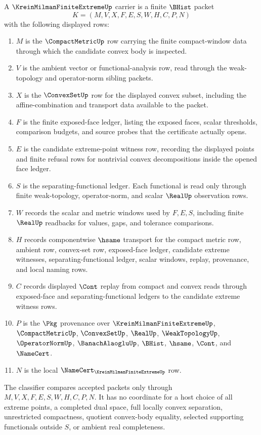 \begin{definition}
\label{def:krein-milman-finite-extreme-carrier}
A $\KreinMilmanFiniteExtremeUp$ carrier is a finite $\BHist$ packet
$$
K=(M,V,X,F,E,S,W,H,C,P,N)
$$
with the following displayed rows:
\begin{enumerate}
\item $M$ is the $\CompactMetricUp$ row carrying the finite compact-window data through which the candidate convex body is inspected.
\item $V$ is the ambient vector or functional-analysis row, read through the weak-topology and operator-norm sibling packets.
\item $X$ is the $\ConvexSetUp$ row for the displayed convex subset, including the affine-combination and transport data available to the packet.
\item $F$ is the finite exposed-face ledger, listing the exposed faces, scalar thresholds, comparison budgets, and source probes that the certificate actually opens.
\item $E$ is the candidate extreme-point witness row, recording the displayed points and finite refusal rows for nontrivial convex decompositions inside the opened face ledger.
\item $S$ is the separating-functional ledger. Each functional is read only through finite weak-topology, operator-norm, and scalar $\RealUp$ observation rows.
\item $W$ records the scalar and metric windows used by $F,E,S$, including finite $\RealUp$ readbacks for values, gaps, and tolerance comparisons.
\item $H$ records componentwise $\hsame$ transport for the compact metric row, ambient row, convex-set row, exposed-face ledger, candidate extreme witnesses, separating-functional ledger, scalar windows, replay, provenance, and local naming rows.
\item $C$ records displayed $\Cont$ replay from compact and convex reads through exposed-face and separating-functional ledgers to the candidate extreme witness rows.
\item $P$ is the $\Pkg$ provenance over $\KreinMilmanFiniteExtremeUp$, $\CompactMetricUp$, $\ConvexSetUp$, $\RealUp$, $\WeakTopologyUp$, $\OperatorNormUp$, $\BanachAlaogluUp$, $\BHist$, $\hsame$, $\Cont$, and $\NameCert$.
\item $N$ is the local $\NameCert_{\KreinMilmanFiniteExtremeUp}$ row.
\end{enumerate}
The classifier compares accepted packets only through $M,V,X,F,E,S,W,H,C,P,N$. It has no coordinate for a host choice of all extreme points, a completed dual space, full locally convex separation, unrestricted compactness, quotient convex-body equality, selected supporting functionals outside $S$, or ambient real completeness.
\end{definition}

